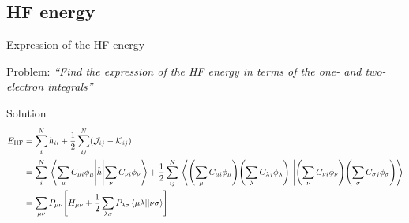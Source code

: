 \documentclass[aspectratio=169,9pt]{beamer}
\newcommand{\hh}{\hat{h}}
\newcommand{\cJ}{\mathcal{J}}
\newcommand{\cK}{\mathcal{K}}
\newcommand{\violet}[1]{\textcolor{hfViolet}{#1}}
\begin{document}
\subsection{HF energy}
\begin{frame}{Expression of the HF energy}
	\begin{block}{Problem:}
		\violet{\textit{``Find the expression of the HF energy in terms of the one- and two-electron integrals''}}
	\end{block}
	\pause
	\begin{block}{Solution}
		\begin{equation*}
			\begin{split}
				E_\text{HF} 
				& = \sum_i^N h_{ii} + \frac{1}{2} \sum_{ij}^N (\cJ_{ij} - \cK_{ij}) 
				\\
				& = \sum_i^N  \mel{ \sum_\mu C_{\mu i} \phi_\mu }{ \hh }{  \sum_\nu C_{\nu i} \phi_\nu } 
				+ \frac{1}{2} \sum_{ij}^N \mel{ \qty(\sum_\mu C_{\mu i} \phi_\mu) \qty(\sum_\lambda C_{\lambda j} \phi_\lambda)} {} { \qty(\sum_\nu C_{\nu i} \phi_\nu) \qty(\sum_\sigma C_{\sigma j} \phi_\sigma)}
				\\
				& = \sum_{\mu \nu} P_{\mu \nu} \qty[ H_{\mu \nu} + \frac{1}{2} \sum_{\lambda \sigma} P_{\lambda \sigma} \mel{ \mu \lambda }{}{ \nu \sigma } ]
			\end{split}
		\end{equation*}
	\end{block}
\end{frame}


\end{document}
